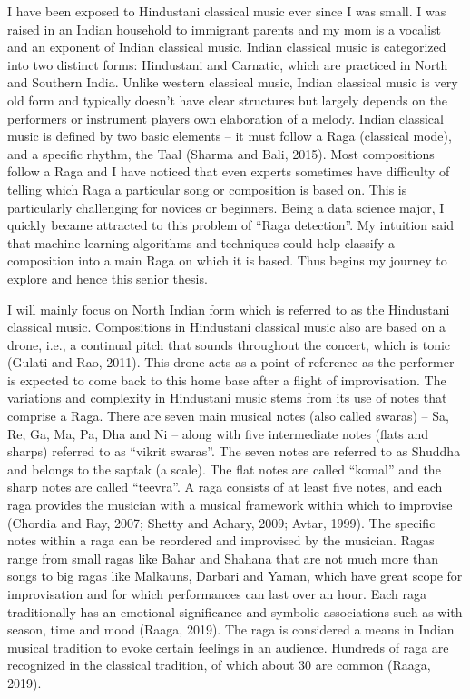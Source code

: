 \doublespacing
\setlength{\parindent}{1cm}

\par

I have been exposed to Hindustani classical music ever since I was small. I was raised in an Indian household to immigrant parents and my mom is a vocalist and an exponent of Indian classical music. Indian classical music is categorized into two distinct forms: Hindustani and Carnatic, which are practiced in North and Southern India. Unlike western classical music, Indian classical music is very old form and typically doesn’t have clear structures but largely depends on the performers or instrument players own elaboration of a melody. Indian classical music is defined by two basic elements – it must follow a Raga (classical mode), and a specific rhythm, the Taal (Sharma and Bali, 2015). Most compositions follow a Raga and I have noticed that even experts sometimes have difficulty of telling which Raga a particular song or composition is based on. This is particularly challenging for novices or beginners. Being a data science major, I quickly became attracted to this problem of “Raga detection”. My intuition said that machine learning algorithms and techniques could help classify a composition into a main Raga on which it is based. Thus begins my journey to explore and hence this senior thesis. \par

I will mainly focus on North Indian form which is referred to as the Hindustani classical music. Compositions in Hindustani classical music also are based on a drone, i.e., a continual pitch that sounds throughout the concert, which is tonic (Gulati and Rao, 2011). This drone acts as a point of reference as the performer is expected to come back to this home base after a flight of improvisation. The variations and complexity in Hindustani music stems from its use of notes that comprise a Raga. There are seven main musical notes (also called swaras) – Sa, Re, Ga, Ma, Pa, Dha and Ni – along with five intermediate notes (flats and sharps) referred to as “vikrit swaras”. The seven notes are referred to as Shuddha and belongs to the saptak (a scale). The flat notes are called “komal” and the sharp notes are called “teevra”. A raga consists of at least five notes, and each raga provides the musician with a musical framework within which to improvise (Chordia and Ray, 2007; Shetty and Achary, 2009; Avtar, 1999). The specific notes within a raga can be reordered and improvised by the musician. Ragas range from small ragas like Bahar and Shahana that are not much more than songs to big ragas like Malkauns, Darbari and Yaman, which have great scope for improvisation and for which performances can last over an hour. Each raga traditionally has an emotional significance and symbolic associations such as with season, time and mood (Raaga, 2019).  The raga is considered a means in Indian musical tradition to evoke certain feelings in an audience. Hundreds of raga are recognized in the classical tradition, of which about 30 are common (Raaga, 2019). \par

